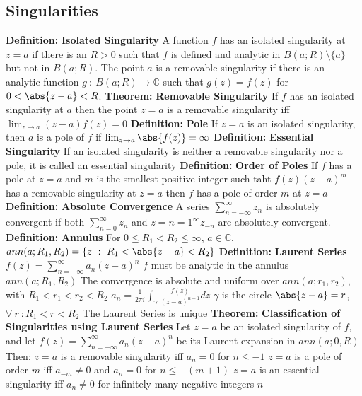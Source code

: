 \documentclass[14pt]{extarticle}
\def\Definition{{\color{blue} \textbf{Definition:} }}
\def\Theorem{{\color{red} \textbf{Theorem:} }}
\begin{document}
\begin{outline}
\section*{Singularities}
	\1	\Definition \textbf{Isolated Singularity}
		\2	A function $f$ has an isolated singularity at $z = a$ if there is an 
				$R > 0$ such that $f$ is defined and analytic in $B(a;R) \setminus \{a\}$
				but not in $B(a;R)$.  
		\2	The point $a$ is a removable singularity if there is an analytic function
				$g~:~B(a;R) \rightarrow \mathbb{C}$ such that $g(z) = f(z)$ for 
				$0 < \abs{z - a} < R$.
	\1	\Theorem \textbf{Removable Singularity}
		\2	If $f$ has an isolated singularity at $a$ then the point $z = a$ is
				a removable singularity iff $\lim_{z \rightarrow a} (z-a)f(z) = 0$
	\1	\Definition \textbf{Pole}
		\2	If $z = a$ is an isolated singularity, then $a$ is a pole of $f$ if
				$\lim_{z \rightarrow a} \abs{f(z)} = \infty$
	\1	\Definition \textbf{Essential Singularity}
		\2	If an isolated singularity is neither a removable singularity nor a pole,
				it is called an essential singularity
	\1	\Definition \textbf{Order of Poles}
		\2	If $f$ has a pole at $z = a$ and $m$ is the smallest positive integer
				such taht $f(z)(z - a)^m$ has a removable singularity at $z = a$ then
				$f$ has a pole of order $m$ at $z = a$
	\1	\Definition \textbf{Absolute Convergence}
		\2	A series $\sum_{n=-\infty}^{\infty} z_n$ is absolutely convergent if 
				both $\sum_{n=0}^{\infty}z_n$ and $z={n=1}^{\infty} z_{-n}$ are absolutely
				convergent.
	\1	\Definition \textbf{Annulus}
		\2	For $0 \le R_1 < R_2 \le \infty$, $a \in \mathbb{C}$, 
				$ann(a;R_1,R_2) = \{z~:~R_1 < \abs{z - a} < R_2\}$
	\1	\Definition \textbf{Laurent Series}
		\2	$f(z) = \sum_{n=-\infty}^{\infty} a_n (z - a)^n$
		\2	$f$ must be analytic in the annulus $ann(a;R_1,R_2)$
		\2	The convergence is absolute and uniform over $ann(a;r_1,r_2)$, 
				with $R_1 < r_1 < r_2 < R_2$
		\2	$a_n = \frac{1}{2\pi i} \int_{\gamma} \frac{f(z)}{(z - a)^{n+1}}dz$
			\3	$\gamma$ is the circle $\abs{z - a} = r$, $\forall~r~:R_1 < r < R_2$
		\2	The Laurent Series is unique
	\1	\Theorem \textbf{Classification of Singularities using Laurent Series}
		\2	Let $z = a$ be an isolated singularity of $f$, and let
				$f(z) = \sum_{n=-\infty}^{\infty} a_n(z - a)^n$ be its Laurent expansion
				in $ann(a;0,R)$ Then:
				\3	$z = a$ is a removable singularity iff $a_n = 0$ for $n \le -1$
				\3	$z = a$ is a pole of order $m$ iff $a_{-m} \ne 0$ and $a_n = 0$ for $n \le -(m+1)$
				\3	$z = a$ is an essential singularity iff $a_n \ne 0$ for infinitely
						many negative integers $n$

\end{outline}
\end{document}

